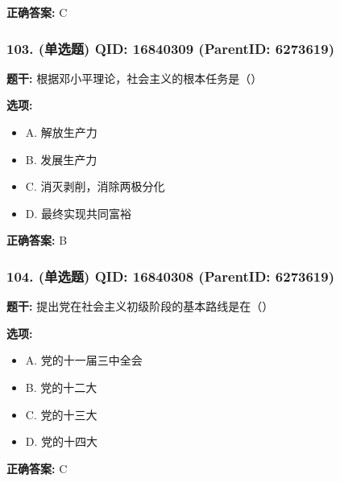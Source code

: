 \documentclass[12pt,UTF8]{ctexart}
\begin{document}
\textbf{正确答案:}
C

\vspace{0.3em}\hrulefill\vspace{0.7em}

\subsubsection*{103. (单选题) \small QID: 16840309 (ParentID: 6273619)}

\textbf{题干:}
根据邓小平理论，社会主义的根本任务是（）



\textbf{选项:}
\begin{itemize}[leftmargin=*]

  \item A. 解放生产力

  \item B. 发展生产力

  \item C. 消灭剥削，消除两极分化

  \item D. 最终实现共同富裕

\end{itemize}

\textbf{正确答案:}
B

\vspace{0.3em}\hrulefill\vspace{0.7em}

\subsubsection*{104. (单选题) \small QID: 16840308 (ParentID: 6273619)}

\textbf{题干:}
提出党在社会主义初级阶段的基本路线是在（）



\textbf{选项:}
\begin{itemize}[leftmargin=*]

  \item A. 党的十一届三中全会

  \item B. 党的十二大

  \item C. 党的十三大

  \item D. 党的十四大

\end{itemize}

\textbf{正确答案:}
C
\end{document}
